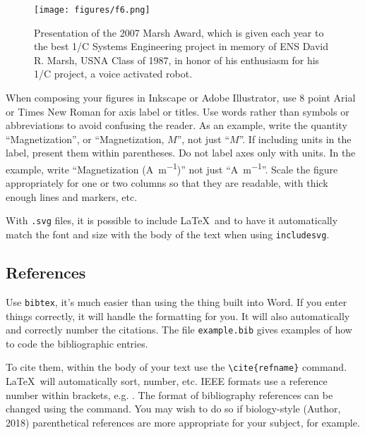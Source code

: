 \documentclass{wsecapstone}
\begin{document}
\begin{figure}[hpb]
\begin{center}
\texttt{[image: figures/f6.png]}
\end{center}
\caption{Presentation of the 2007 Marsh Award, which is given each year to the best 1/C Systems Engineering project in memory of ENS David R.  Marsh, USNA Class of 1987, in honor of his enthusiasm for his 1/C project, a voice activated robot.}
\label{f6}
\end{figure}

When composing your figures in Inkscape or Adobe Illustrator, use 8 point Arial or Times New Roman for axis label or titles. Use words rather than symbols or abbreviations to avoid confusing the reader. As an example, write the quantity ``Magnetization'', or ``Magnetization, $M$'', not just ``$M$''. If including units in the label, present them within parentheses. Do not label axes only with units. In the example, write ``Magnetization (\si{\ampere\per\meter})'' not just ``\si{\ampere\per\meter}''. Scale the figure appropriately for one or two columns so that they are readable, with thick enough lines and markers, etc. 

With \lstinline{.svg} files, it is possible to include \LaTeX\ and to have it automatically match the font and size with the body of the text when using \lstinline{includesvg}. 

\subsection{References}
Use \lstinline{bibtex}, it's much easier than using the thing built into Word. If you enter things correctly, it will handle the formatting for you. It will also automatically and correctly number the citations. The file \lstinline{example.bib} gives examples of how to code the bibliographic entries. 

To cite them, within the body of your text use the \lstinline|\cite{refname}| command. \LaTeX\ will automatically sort, number, etc. IEEE formats use a reference number within brackets, e.g. \cite{young1964synthetic}. The format of bibliography references can be changed using the \lstinline|| command. You may wish to do so if biology-style (Author, 2018) parenthetical references are more appropriate for your subject, for example. 
\end{document}
